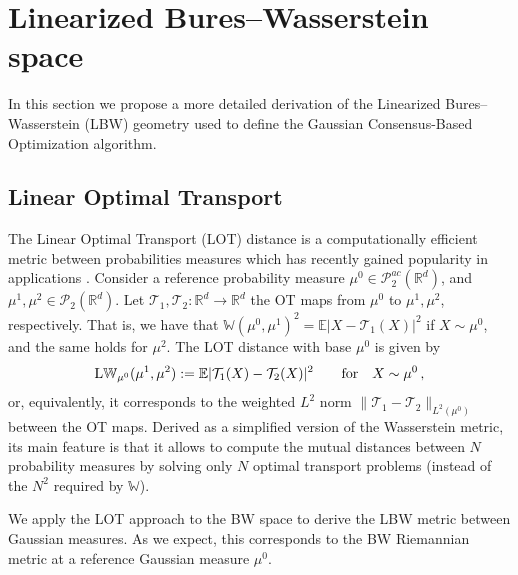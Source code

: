 \documentclass{article}
\theoremstyle{plain}
\theoremstyle{definition}
\theoremstyle{remark}
\newcommand{\Rd}{ {\mathbb{R}^d}}
\newcommand{\W}{\mathbb{W}}
\newcommand{\LW}{\textup{L}\mathbb{W}}
\begin{document}
\section{Linearized Bures--Wasserstein space}
\label{app:lbw}

In this section we propose a more detailed derivation of the Linearized Bures--Wasserstein (LBW) geometry used to define the Gaussian Consensus-Based Optimization algorithm.

\subsection{Linear Optimal Transport} 

The Linear Optimal Transport (LOT) distance is a computationally efficient metric between probabilities measures which has recently gained popularity in applications \cite{kolouri2016continuous,moosmuller2023linear,sarrazin2024lot,craig2020lot}. 
Consider a  reference probability measure $\mu^0 \in \mathcal{P}_2^{ac}(\Rd)$, and $\mu^1, \mu^2 \in \mathcal{P}_2(\Rd)$. Let $\mathcal{T}_1, \mathcal{T}_2:\Rd \to \Rd$ the  OT  maps from $\mu^0$ to $\mu^1, \mu^2$, respectively. That is, we have that $\W(\mu^0, \mu^1)^2 = \mathbb{E} |X - \mathcal{T}_1(X)|^2$ if $X \sim \mu^0$, and the same holds for $\mu^2$. The LOT distance with base $\mu^0$ is given by 
\begin{equation}
\LW_{\mu^0}(\mu^1, \mu^2):= \mathbb{E} |\mathcal{T}_1(X) - \mathcal{T}_2(X) |^2  \qquad \text{for}\quad  X\sim \mu^0\,,
\end{equation}
or, equivalently, it corresponds to the weighted $L^2$ norm $\| \mathcal{T}_1 - \mathcal{T}_2\|_{L^2(\mu^0)}$ between the OT maps. Derived as a simplified version of the Wasserstein metric, its main feature is that it allows to compute the mutual distances between $N$ probability measures by solving only $N$ optimal transport problems (instead of the $N^2$ required by $\W$).

We apply the LOT approach to the BW space to derive the LBW metric between Gaussian measures. As we expect, this corresponds to the BW Riemannian metric at a reference Gaussian measure $\mu^0$. 
\end{document}
